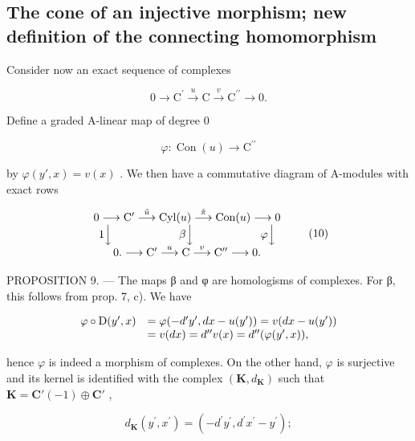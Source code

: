 \subsection{The cone of an injective morphism; new definition of the connecting homomorphism}

Consider now an exact sequence of complexes

\[
0 \rightarrow \mathrm{C} ^ {\prime} \xrightarrow {u} \mathrm{C} \xrightarrow {v} \mathrm{C} ^ {\prime \prime} \rightarrow 0.\tag{9}
\]

Define a graded A-linear map of degree 0

\[
\varphi : \operatorname{Con} (u) \rightarrow \mathrm{C} ^ {\prime \prime}
\]

by \(\varphi(y', x) = v(x)\) . We then have a commutative diagram of A-modules with exact rows

\[
\begin{array}{c} 0 \longrightarrow \mathrm{C} ^ {\prime} \stackrel {{\tilde {u}}} {{\longrightarrow}} \mathrm{Cyl} (u) \stackrel {{\tilde {\pi}}} {{\longrightarrow}} \mathrm{Con} (u) \longrightarrow 0 \\ 1 \Big \downarrow \qquad \qquad \qquad \beta \Big \downarrow \qquad \qquad \qquad \varphi \Big \downarrow \\ 0. \longrightarrow \mathrm{C} ^ {\prime} \stackrel {{u}} {{\longrightarrow}} \mathrm{C} \stackrel {{v}} {{\longrightarrow}} \mathrm{C} ^ {\prime \prime} \longrightarrow 0. \end{array}\tag{10}
\]

PROPOSITION 9. --- The maps β and φ are homologisms of complexes. For β, this follows from prop. 7, c). We have

\[
\begin{array}{r l} \varphi \circ \mathrm{D} (y ^ {\prime}, x) & = \varphi (- d ^ {\prime} y ^ {\prime}, d x - u (y ^ {\prime})) = v (d x - u (y ^ {\prime})) \\ & = v (d x) = d ^ {\prime \prime} v (x) = d ^ {\prime \prime} (\varphi (y ^ {\prime}, x)), \end{array}
\]

hence \(\varphi\) is indeed a morphism of complexes. On the other hand, \(\varphi\) is surjective and its kernel is identified with the complex \((\mathbf{K}, d_{\mathbf{K}})\) such that \(\mathbf{K} = \mathbf{C}'(-1) \oplus \mathbf{C}'\) ,

\[
d _ {\mathbf {K}} (y ^ {\prime}, x ^ {\prime}) = (- d ^ {\prime} y ^ {\prime}, d ^ {\prime} x ^ {\prime} - y ^ {\prime});
\]

